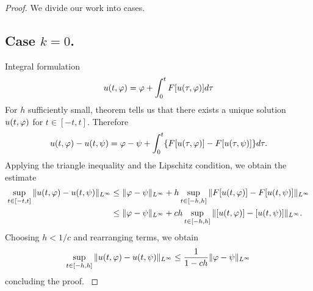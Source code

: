 \begin{proof}
  We divide our work into cases.
  \subsection{Case $k = 0$.} Integral formulation
  \begin{equation*}
  \begin{split}
  u(t, \varphi) = \varphi + \int_{0}^{t} F[u(\tau, \varphi)] d \tau
  \end{split}
  \end{equation*}
  For $h$ sufficiently small, theorem tells us that there exists a unique solution $u(t, \varphi)$ for $t \in [-t, t]$. Therefore
  \begin{equation*}
  \begin{split}
  u(t, \varphi) - u(t, \psi) = \varphi - \psi + \int_{0}^{t} \{F[u(\tau, \varphi)] - F[u(\tau, \psi)]\} d \tau.
  \end{split}
  \end{equation*}
 Applying the triangle inequality and the Lipschitz condition, we obtain the estimate
  \begin{equation*}
  \begin{split}
  \sup_{t \in [-t, t]} \|u(t, \varphi) - u(t, \psi)\|_{L^{\infty}}
  & \le \|\varphi -
  \psi\|_{L^{\infty}} +  h \sup_{t \in [-h, h]} \|F[u(t, \varphi)] - F[u(t, \psi)] \|_{L^{\infty}}
  \\
  & \le \|\varphi - \psi\|_{L^{\infty}} +  ch \sup_{t \in [-h, h]} \|[u(t, \varphi)] -
  [u(t, \psi)] \|_{L^{\infty}}.
  \end{split}
  \end{equation*}
Choosing $h < 1/c$ and rearranging terms, we obtain
%
%
\begin{equation*}
\begin{split}
\sup_{t \in [-h, h]} \| u(t, \varphi) - u(t, \psi) \|_{L^{\infty}} \le \frac{1}{1-ch} \| \varphi - \psi \|_{L^{\infty}}
\end{split}
\end{equation*}
%
%
concluding the proof.
 \label{ssec:case-0}

\end{proof}
